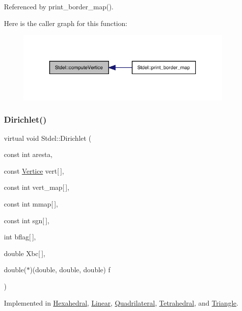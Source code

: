 Referenced by print\+\_\+border\+\_\+map().

Here is the caller graph for this function\+:
\nopagebreak
\begin{figure}[H]
\begin{center}
\leavevmode
\includegraphics[width=303pt]{classStdel_a74eed41f670878759c84e2014b4a2cd5_icgraph}
\end{center}
\end{figure}
\mbox{\label{classStdel_a92e13b000249ba73b35407d925cbd7a8}} 
\subsubsection{\texorpdfstring{Dirichlet()}{Dirichlet()}}
{\footnotesize\ttfamily virtual void Stdel\+::\+Dirichlet (\begin{DoxyParamCaption}\item[{const int}]{aresta,  }\item[{const \hyperlink{structVertice}{Vertice}}]{vert\mbox{[}$\,$\mbox{]},  }\item[{const int}]{vert\+\_\+map\mbox{[}$\,$\mbox{]},  }\item[{const int}]{mmap\mbox{[}$\,$\mbox{]},  }\item[{const int}]{sgn\mbox{[}$\,$\mbox{]},  }\item[{int}]{bflag\mbox{[}$\,$\mbox{]},  }\item[{double}]{Xbc\mbox{[}$\,$\mbox{]},  }\item[{double($\ast$)(double, double, double)}]{f }\end{DoxyParamCaption})\hspace{0.3cm}{\ttfamily [pure virtual]}}



Implemented in \hyperlink{classHexahedral_a86088799f63b981f6a350397d10e2efa}{Hexahedral}, \hyperlink{classLinear_a5c45a2a325998e84e10082a6073f7dfc}{Linear}, \hyperlink{classQuadrilateral_a98e726588eff16203239599aabe7d8db}{Quadrilateral}, \hyperlink{classTetrahedral_afa5ab92fac0ada8385fddf3ddec3a8fc}{Tetrahedral}, and \hyperlink{classTriangle_a8895a8448dcfdefefb94681518530c0f}{Triangle}.




